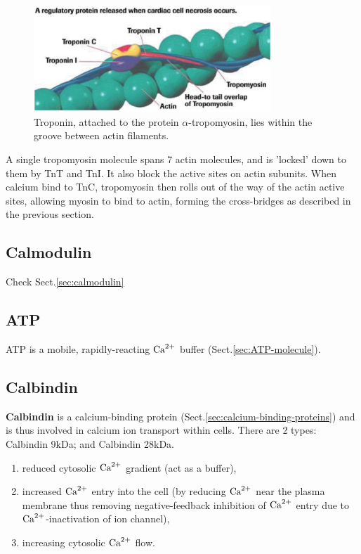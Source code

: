 \begin{figure}[hbt]
  \centerline{\includegraphics[height=4cm,
    angle=0]{./images/troponin.eps}}
\caption{Troponin, attached to the protein $\alpha$-tropomyosin, lies within the
groove between actin filaments.}
\label{fig:troponin}
\end{figure}

A single tropomyosin molecule spans 7 actin molecules, and is 'locked' down to
them by TnT and TnI. It also block the active sites on actin subunits.
When calcium bind to TnC, tropomyosin then rolls out of the way of the actin
active sites, allowing myosin to bind to actin, forming the cross-bridges as
described in the previous section.


\subsection{Calmodulin}

Check Sect.\ref{sec:calmodulin}

\subsection{ATP}

ATP is a mobile, rapidly-reacting ${\text{Ca}^{2+}}$ buffer (Sect.\ref{sec:ATP-molecule}). 


\subsection{Calbindin}
\label{sec:calbindin}

{\bf Calbindin} is a calcium-binding protein (Sect.\ref{sec:calcium-binding-proteins})
and is thus involved in calcium ion transport within cells. There are 2 types:
Calbindin 9kDa; and Calbindin 28kDa.
\begin{enumerate}
  \item reduced cytosolic ${\text{Ca}^{2+}}$ gradient (act as a buffer), 
  
  \item increased ${\text{Ca}^{2+}}$ entry into the cell (by reducing ${\text{Ca}^{2+}}$ near the plasma
membrane thus removing negative-feedback inhibition of ${\text{Ca}^{2+}}$ entry due to
${\text{Ca}^{2+}}$-inactivation of ion channel), 

  \item increasing cytosolic ${\text{Ca}^{2+}}$ flow.
\end{enumerate}

